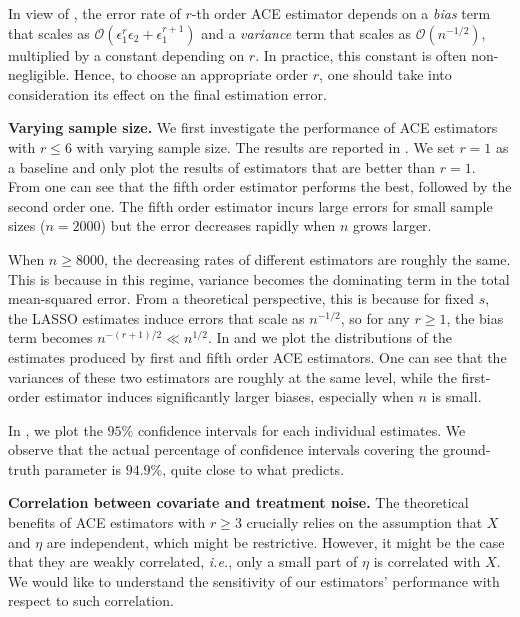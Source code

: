 \documentclass{article}
\def\eps{{\epsilon}}
\def\gO{{\mathcal{O}}}
\begin{document}
In view of , the error rate of $r$-th order ACE estimator depends on a \emph{bias} term that scales as $\gO(\eps_1^r\eps_2+\eps_1^{r+1})$  and a \emph{variance} term that scales as $\gO(n^{-1/2})$, multiplied by a constant depending on $r$. In practice, this constant is often non-negligible. Hence, to choose an appropriate order $r$, one should take into consideration its effect on the final estimation error.


\textbf{Varying sample size.} We first investigate the performance of ACE estimators with $r\leq 6$ with varying sample size. The results are reported in . We set $r=1$ as a baseline and only plot the results of estimators that are better than $r=1$. From  one can see that the fifth order estimator performs the best, followed by the second order one. The fifth order estimator incurs large errors for small sample sizes ($n=2000$) but the error decreases rapidly when $n$ grows larger.

When $n\geq 8000$, the decreasing rates of different estimators are roughly the same. This is because in this regime, variance becomes the dominating term in the total mean-squared error. From a theoretical perspective, this is because for fixed $s$, the LASSO estimates induce errors that scale as $n^{-1/2}$, so for any $r\geq 1$, the bias term becomes $n^{-(r+1)/2}\ll n^{1/2}$. In  and  we plot the distributions of the estimates produced by first and fifth order ACE estimators. One can see that the variances of these two estimators are roughly at the same level, while the first-order estimator induces significantly larger biases, especially when $n$ is small.

%

In , we plot the $95\%$ confidence intervals for each individual estimates. We observe that the actual percentage of confidence intervals covering the ground-truth parameter is $94.9\%$, quite close to what  predicts.

\textbf{Correlation between covariate and treatment noise.} The theoretical benefits of ACE estimators with $r\geq 3$ crucially relies on the assumption that $X$ and $\eta$ are independent, which might be restrictive. However, it might be the case that they are weakly correlated, \emph{i.e.}, only a small part of $\eta$ is correlated with $X$. We would like to understand the sensitivity of our estimators' performance with respect to such correlation.
\end{document}
